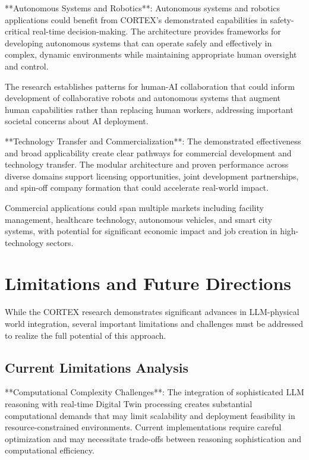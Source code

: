 **Autonomous Systems and Robotics**:
Autonomous systems and robotics applications could benefit from CORTEX's demonstrated capabilities in safety-critical real-time decision-making. The architecture provides frameworks for developing autonomous systems that can operate safely and effectively in complex, dynamic environments while maintaining appropriate human oversight and control.

The research establishes patterns for human-AI collaboration that could inform development of collaborative robots and autonomous systems that augment human capabilities rather than replacing human workers, addressing important societal concerns about AI deployment.

**Technology Transfer and Commercialization**:
The demonstrated effectiveness and broad applicability create clear pathways for commercial development and technology transfer. The modular architecture and proven performance across diverse domains support licensing opportunities, joint development partnerships, and spin-off company formation that could accelerate real-world impact.

Commercial applications could span multiple markets including facility management, healthcare technology, autonomous vehicles, and smart city systems, with potential for significant economic impact and job creation in high-technology sectors.

\section{Limitations and Future Directions}

While the CORTEX research demonstrates significant advances in LLM-physical world integration, several important limitations and challenges must be addressed to realize the full potential of this approach.

\subsection{Current Limitations Analysis}

**Computational Complexity Challenges**:
The integration of sophisticated LLM reasoning with real-time Digital Twin processing creates substantial computational demands that may limit scalability and deployment feasibility in resource-constrained environments. Current implementations require careful optimization and may necessitate trade-offs between reasoning sophistication and computational efficiency.

